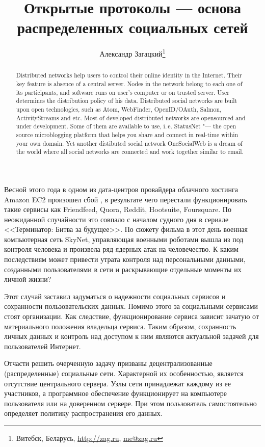 \documentclass[10pt, a5paper]{article}
\begin{document}
\title{Открытые протоколы --- основа распределенных социальных сетей}
\author{Александр Загацкий\footnote{Витебск, Беларусь, \url{http://zag.ru}, \url{me@zag.ru}}}
\date{}
\maketitle

\begin{abstract}Distributed networks help users to control their online iden\-ti\-ty in the Internet.
Their key feature is absence of a central server. Nodes
in the network belong to each one of its
participants, and software runs on user's computer
or on trusted server. User determines the distribution policy
of his data.
Distributed social networks are built upon open technologies, such as Atom,
Web\-Finder, OpenID/OAuth, Salmon, ActivityStreams and etc.
Most of de\-ve\-loped distributed networks are opensourced and under
development. Some of them are available to use, i.\,e. 
StatusNet "--- the open source microblogging platform that
helps you share and connect in real-time within your own domain. Yet
another distibuted social network OneSocialWeb is a dream of the world where
all social networks are connected and work together similar
to email.
\end{abstract}
Весной этого года в одном из дата-центров провайдера облачного хостинга
Amazon EC2 произошел сбой \cite{zag1}, в результате чего перестали
 функционировать такие сервисы как Friendfeed, Quora, Reddit, Hootsuite,
 Foursquare. По неожиданной случайности это совпало с началом судного дня
 в сериале <<Терминатор: Битва за будущее>>. По сюжету фильма в этот день
 военная компьютерная сеть SkyNet, управляющая военными роботами вышла из
 под контроля человека и произвела ряд ядерных атак на человечество. К
 каким последствиям может привести утрата контроля над персональными
 данными, созданными пользователями в сети и раскрывающие отдельные
 моменты их личной жизни?

 Этот случай заставил задуматься о надежности социальных сервисов и
 сохранности пользовательских данных. Помимо этого за социальными
 сервисами стоят организации. Как следствие, функционирование сервиса
 зависит зачатую от материального положения владельца сервиса. Таким
 образом, сохранность личных данных и контроль над доступом к ним являются
 актуальной задачей для пользователей Интернет.

 Отчасти решить очерченную задачу призваны децентрализованные
 (распределенные) социальные сети. Характерной их особенностью, является
 отсутствие центрального сервера. Узлы сети принадлежат каждому из ее
 участников, а программное обеспечение функционирует на компьютере
 пользователя или на доверенном сервере. При этом пользователь
 самостоятельно определяет политику распространения его данных.
\end{document}
